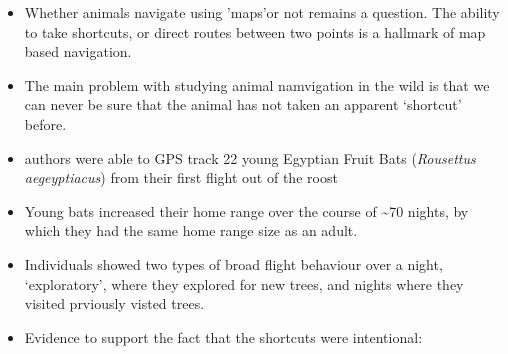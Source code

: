 \documentclass[
]{book}
\begin{document}
\begin{itemize}
\item
  Whether animals navigate using 'maps'or not remains a question. The ability to take shortcuts, or direct routes between two points is a hallmark of map based navigation.
\item
  The main problem with studying animal namvigation in the wild is that we can never be sure that the animal has not taken an apparent `shortcut' before.
\item
  authors were able to GPS track 22 young Egyptian Fruit Bats (\emph{Rousettus aegeyptiacus}) from their first flight out of the roost
\item
  Young bats increased their home range over the course of \textasciitilde70 nights, by which they had the same home range size as an adult.
\item
  Individuals showed two types of broad flight behaviour over a night, `exploratory', where they explored for new trees, and nights where they visited prviously visted trees.
\item
  Evidence to support the fact that the shortcuts were intentional:


\end{itemize}
\end{document}
